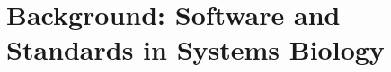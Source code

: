 \newcommand{\bgamma}{\mbox{\boldmath $\Gamma$}}

\newcommand{\bL}{\mbox{\boldmath $L$}}

\newcommand{\bT}{\mbox{\boldmath $T$}}

\newcommand{\bI}{\mbox{\boldmath $I$}}

\newcommand{\bM}{\mbox{\boldmath $M$}}

\newcommand{\bm}{\mbox{\boldmath $m$}}

\newcommand{\bN}{\mbox{\boldmath $N$}}

\newcommand{\bE}{\mbox{\boldmath $E$}}

\newcommand{\bA}{\mbox{\boldmath $A$}}

\newcommand{\bB}{\mbox{\boldmath $B$}}

\newcommand{\bK}{\mbox{\boldmath $K$}}

\newcommand{\bP}{\mbox{\boldmath $P$}}

\newcommand{\bx}{\mbox{\boldmath $x$}}

\newcommand{\bU}{\mbox{\boldmath $U$}}

\newcommand{\bV}{\mbox{\boldmath $V$}}

\newcommand{\bZero}{\mbox{\boldmath $0$}}

\newcommand{\bLo}{\mbox{\boldmath $L_0$}}

\newcommand{\bNo}{\mbox{\boldmath $N_0$}}

\newcommand{\bNr}{\mbox{\boldmath $N_R$}}

\newcommand{\bSi}{\mbox{\boldmath $S_i$}}

\newcommand{\bSd}{\mbox{\boldmath $S_d$}}

\newcommand{\bdSi}{\mbox{\boldmath $dS_i$}}

\newcommand{\bdSd}{\mbox{\boldmath $dS_d$}}

\newcommand{\bS}{\mbox{\boldmath $S$}}

\newcommand{\bdS}{\mbox{\boldmath $dS$}}

\newcommand{\bdt}{\mbox{\boldmath $dt$}}

\newcommand{\bdSdt}{\mbox{$\displaystyle \frac{\bdS}{\bdt}$}}

\newcommand{\bdSddt}{\mbox{$\displaystyle \frac{\bdS_d}{\bdt}$}}

\newcommand{\bdSidt}{\mbox{$\displaystyle \frac{\bdS_i}{\bdt}$}}

\newcommand{\bv}{\mbox{\boldmath $v$}}

\newcommand{\bp}{\mbox{\boldmath $p$}}


\chapter{Background: Software and Standards in Systems Biology}

